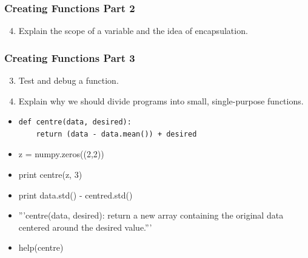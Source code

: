 \documentclass[xcolor=dvipsnames]{beamer}
\begin{document}
\begin{frame}
\frametitle{Creating Functions Part 2}
\begin{enumerate}
\setcounter{enumi}{3}
\item    Explain the scope of a variable and the idea of encapsulation.
\end{enumerate}
\end{frame}


\begin{frame}[fragile]
\frametitle{Creating Functions Part 3}
\begin{enumerate}
\setcounter{enumi}{2}
\item    Test and debug a function.
\item    Explain why we should divide programs into small, single-purpose functions.
\end{enumerate}
\begin{itemize}
\item
\begin{verbatim}
def centre(data, desired):
    return (data - data.mean()) + desired
\end{verbatim}
\item z = numpy.zeros((2,2))
\item print centre(z, 3)
\item print data.std() - centred.std()
\item '''centre(data, desired): return a new array containing the original data centered around the desired value.'''
\item help(centre)
\end{itemize}
\end{frame}
\end{document}
